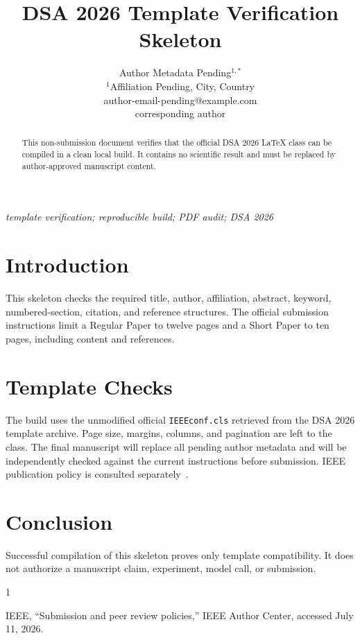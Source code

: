 \documentclass[conference]{IEEEconf}
\begin{document}
\title{\textbf{\Large DSA 2026 Template Verification Skeleton\\}}

\author{Author Metadata Pending$^{1,*}$\\
  \normalsize $^{1}$Affiliation Pending, City, Country\\
  \normalsize author-email-pending@example.com\\
  \normalsize *corresponding author
}

\maketitle

\begin{abstract}
This non-submission document verifies that the official DSA 2026 LaTeX class
can be compiled in a clean local build. It contains no scientific result and
must be replaced by author-approved manuscript content.
\end{abstract}

\IEEEoverridecommandlockouts
\vspace{1.5ex}
\begin{keywords}
\itshape template verification; reproducible build; PDF audit; DSA 2026
\end{keywords}

\section{Introduction}

This skeleton checks the required title, author, affiliation, abstract,
keyword, numbered-section, citation, and reference structures. The official
submission instructions limit a Regular Paper to twelve pages and a Short
Paper to ten pages, including content and references.

\section{Template Checks}

The build uses the unmodified official \texttt{IEEEconf.cls} retrieved from
the DSA 2026 template archive. Page size, margins, columns, and pagination are
left to the class. The final manuscript will replace all pending author
metadata and will be independently checked against the current instructions
before submission. IEEE publication policy is consulted separately~\cite{ieee-policy}.

\section{Conclusion}

Successful compilation of this skeleton proves only template compatibility.
It does not authorize a manuscript claim, experiment, model call, or
submission.

\begin{thebibliography}{1}

IEEE, ``Submission and peer review policies,'' IEEE Author Center, accessed
July 11, 2026.

\end{thebibliography}
\end{document}
